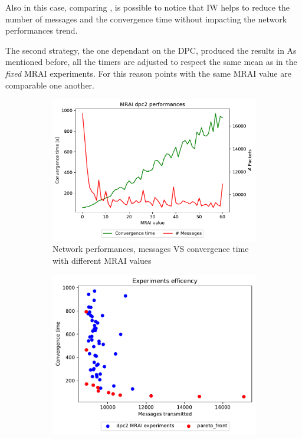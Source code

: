 Also in this case, comparing ,
is possible to notice that \ac{IW}
helps to reduce the number of messages and the convergence time without impacting
the network performances trend.

The second strategy, the one dependant on the \ac{DPC}, produced the results
in 
As mentioned before, all the timers are adjusted to respect the same mean as in
the \textit{fixed} \ac{MRAI} experiments.
For this reason points with the same \ac{MRAI} value are comparable one another.

\begin{figure}[h]
     \centering
     \begin{subfigure}[b]{0.45\textwidth}
         \centering
         \includegraphics[width=\textwidth]{images/internet_like/1000/dpc/internet_like-DPC_mrai_evolution.pdf}
		 \caption{Network performances, messages VS convergence time with different
			\ac{MRAI} values}
         \label{fig:internt_like_1000_DPC_evolution_evolution}
     \end{subfigure}
     \hfill
     \begin{subfigure}[b]{0.45\textwidth}
         \centering
         \includegraphics[width=\textwidth]{images/internet_like/1000/dpc/internet_like-DPC.pdf}

\end{subfigure}
\end{figure}
